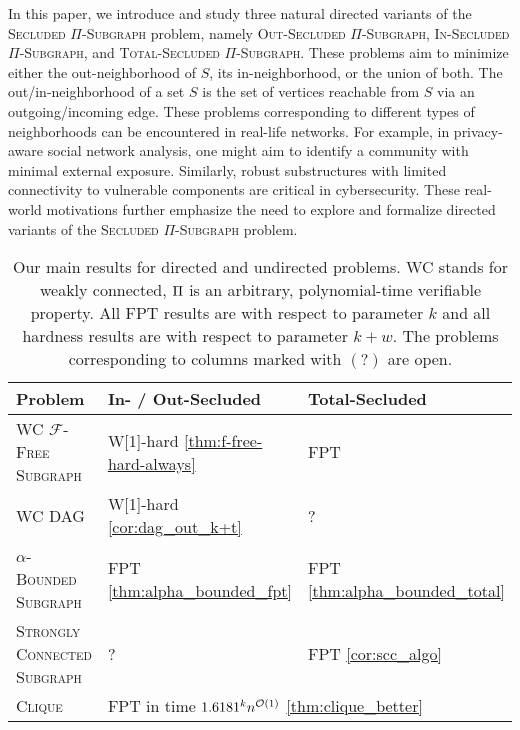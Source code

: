 In this paper, we introduce and study three natural directed variants of the \textsc{Secluded $\Pi$-Subgraph} problem, namely \textsc{Out-Secluded $\Pi$-Subgraph}, \textsc{In-Secluded $\Pi$-Subgraph}, and \textsc{Total-Secluded $\Pi$-Subgraph}. These problems aim to minimize either the out-neighborhood of $S$, its in-neighborhood, or the union of both. The out/in-neighborhood of a set $S$ is the set of vertices reachable from $S$ via an outgoing/incoming edge. %
These problems corresponding to different types of neighborhoods can be encountered in real-life networks. For example, in privacy-aware social network analysis, one might aim to identify a community with minimal external exposure. Similarly, robust substructures with limited connectivity to vulnerable components are critical in cybersecurity. 
These real-world motivations further emphasize the need to explore and formalize directed variants of the \textsc{Secluded $\Pi$-Subgraph} problem. 

\begin{table}[t]
    \centering
    \begin{tabular}{lll}
        \toprule
        \textbf{Problem} & \textbf{In- / Out-Secluded} & \textbf{Total-Secluded}\\
        \midrule
        \textsc{WC $\mathcal{F}$-Free Subgraph} & W[1]-hard \hfill \cref{thm:f-free-hard-always} & FPT \hfill\cite{jansen2023single}\\
        \textsc{WC DAG} & W[1]-hard \hfill \cref{cor:dag_out_k+t} & ?\\
        \textsc{$\alpha$-Bounded Subgraph} & FPT \hfill \cref{thm:alpha_bounded_fpt}& FPT \hfill \cref{thm:alpha_bounded_total}\\
        \textsc{Strongly Connected Subgraph} & ? & FPT \hfill \cref{cor:scc_algo}\\
        \midrule
        \textsc{Clique} & \multicolumn{2}{l}{FPT in time $1.6181^kn^{\mathcal{O}(1)}$ \hfill \cref{thm:clique_better}}\\
        \bottomrule
    \end{tabular}
    \caption{Our main results for directed and undirected problems. WC stands for weakly connected, $\operatorname{\Pi}$ is an arbitrary, polynomial-time verifiable property. All FPT results are with respect to parameter $k$ and all hardness results are with respect to parameter $k+w$. The problems corresponding to columns marked with $(?)$ are open. 
    \label{tab:our_results}}
\end{table}

